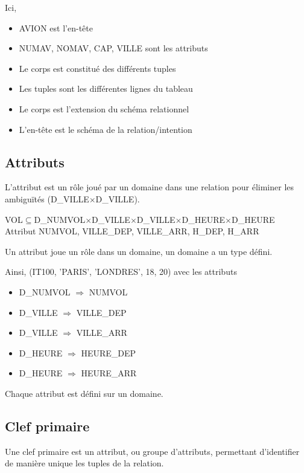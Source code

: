 \documentclass[10pt]{article}
\begin{document}
                Ici,
                \begin{itemize}
                    \item AVION est l'en-tête
                    \item NUMAV, NOMAV, CAP, VILLE sont les attributs
                    \item Le corps est constitué des différents tuples
                    \item Les tuples sont les différentes lignes du tableau
                    \item Le corps est l'extension du schéma relationnel
                    \item L'en-tête est le schéma de la relation/intention
                \end{itemize}

        \subsection{Attributs}
            L'attribut est un rôle joué par un domaine dans une relation pour éliminer les ambiguïtés (D\_VILLE$\times$D\_VILLE).

            VOL$\subseteq$D\_NUMVOL$\times$D\_VILLE$\times$D\_VILLE$\times$D\_HEURE$\times$D\_HEURE\\
            Attribut NUMVOL, VILLE\_DEP, VILLE\_ARR, H\_DEP, H\_ARR

            Un attribut joue un rôle dans un domaine, un domaine a un type défini.

            Ainsi, (IT100, 'PARIS', 'LONDRES', 18, 20) avec les attributs
            \begin{itemize}
                \item D\_NUMVOL $\Rightarrow$ NUMVOL
                \item D\_VILLE $\Rightarrow$ VILLE\_DEP
                \item D\_VILLE $\Rightarrow$ VILLE\_ARR
                \item D\_HEURE $\Rightarrow$ HEURE\_DEP
                \item D\_HEURE $\Rightarrow$ HEURE\_ARR
            \end{itemize}
            Chaque attribut est défini sur un domaine.

        \subsection{Clef primaire}
            Une clef primaire est un attribut, ou groupe d'attributs, permettant d'identifier de manière unique les tuples de la relation.
\end{document}
